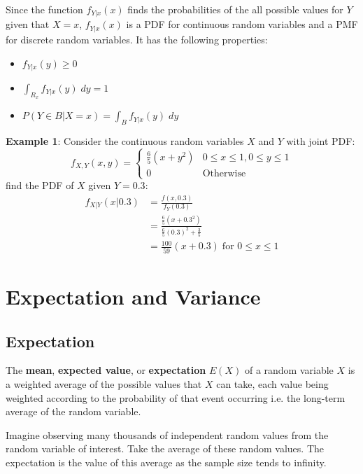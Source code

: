 \documentclass[10pt,a4paper]{article}
\begin{document}
Since the function $f_{Y|x}(x)$ finds the probabilities of the all possible values for $Y$ given
that $X=x$, $f_{Y|x}(x)$ is a PDF for continuous random variables and a PMF for discrete random
variables. It has the following properties:
\begin{itemize}
    \item $f_{Y|x}(y) \geq 0$
    \item $\int_{R_x}f_{Y|x}(y)\; dy = 1$
    \item $P(Y\in B | X=x) = \int_B f_{Y|x}(y)\; dy$
\end{itemize}

\textbf{Example 1}: Consider the continuous random variables $X$ and $Y$ with joint PDF:
$$
    f_{X,Y}(x,y) = 
    \begin{cases}
        \frac{6}{5}(x+y^2) & 0 \leq x \leq 1, 0 \leq y \leq 1 \\
        0 & \text{Otherwise}
    \end{cases}
$$
find the PDF of $X$ given $Y=0.3$:
\begin{align*}
    f_{X|Y}(x|0.3) &= \frac{f(x,0.3)}{f_Y(0.3)} \\
    &= \frac{\frac{6}{5}(x+0.3^2)}{\frac{6}{5}(0.3)^2+\frac{3}{5}} \\
    &= \frac{100}{59}(x+0.3) \; \text{for } 0 \leq x \leq 1
\end{align*}

\section{Expectation and Variance}
\subsection{Expectation}
The \textbf{mean}, \textbf{expected value}, or \textbf{expectation} $E(X)$ of a random variable $X$ is a weighted average of the possible values that $X$ can
take, each value being weighted according to the probability of that event occurring i.e. the
long-term average of the random variable. 

Imagine observing many thousands of independent random values from the random variable of interest.
Take the average of these random values. The expectation is the value of this average as the sample size tends to infinity.
\end{document}
